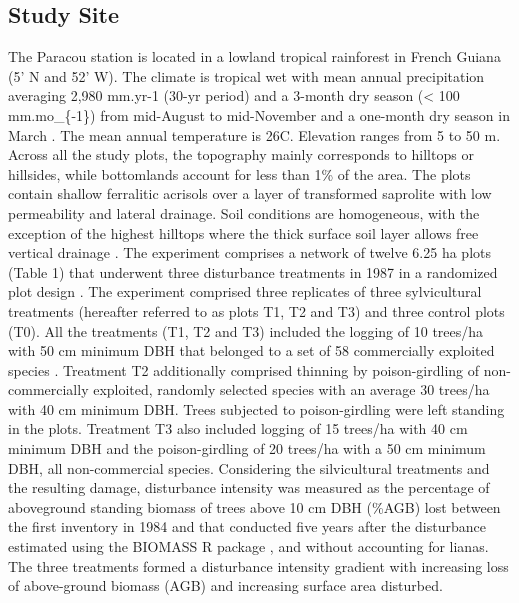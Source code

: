\documentclass[fleqn,10pt]{ArtEcoFoG} %
\begin{document}
\hypertarget{study-site}{%
\subsection{Study Site}\label{study-site}}

The Paracou station is located in a lowland tropical rainforest in French Guiana (5' N and 52' W). The climate is tropical wet with mean annual precipitation averaging 2,980 mm.yr-1 (30-yr period) and a 3-month dry season (\textless{} 100 mm.mo\_\{-1\}) from mid-August to mid-November and a one-month dry season in March \citep{Wagner2011}.
The mean annual temperature is 26\textdegree C. Elevation ranges from 5 to 50 m. Across all the study plots, the topography mainly corresponds to hilltops or hillsides, while bottomlands account for less than 1\% of the area. The plots contain shallow ferralitic acrisols over a layer of transformed saprolite with low permeability and lateral drainage. Soil conditions are homogeneous, with the exception of the highest hilltops where the thick surface soil layer allows free vertical drainage \citep{Gourlet-Fleury2004}.
The experiment comprises a network of twelve 6.25 ha plots (Table 1) that underwent three disturbance treatments in 1987 in a randomized plot design \citep{Herault2018}.
The experiment comprised three replicates of three sylvicultural treatments (hereafter referred to as plots T1, T2 and T3) and three control plots (T0). All the treatments (T1, T2 and T3) included the logging of 10 trees/ha with 50 cm minimum DBH that belonged to a set of 58 commercially exploited species \citep{Gourlet-Fleury2004}.
Treatment T2 additionally comprised thinning by poison-girdling of non-commercially exploited, randomly selected species with an average 30 trees/ha with 40 cm minimum DBH. Trees subjected to poison-girdling were left standing in the plots. Treatment T3 also included logging of 15 trees/ha with 40 cm minimum DBH and the poison-girdling of 20 trees/ha with a 50 cm minimum DBH, all non-commercial species. Considering the silvicultural treatments and the resulting damage, disturbance intensity was measured as the percentage of aboveground standing biomass of trees above 10 cm DBH (\%AGB) lost between the first inventory in 1984 and that conducted five years after the disturbance \citep{Piponiot2016} estimated using the BIOMASS R package \citep{Rejou2017, Biomass2018}, and without accounting for lianas. The three treatments formed a disturbance intensity gradient with increasing loss of above-ground biomass (AGB) and increasing surface area disturbed.
\end{document}
